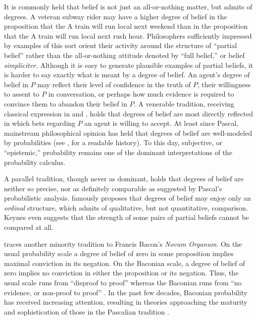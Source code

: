 It is commonly held that belief is not just an all-or-nothing matter, but admits
of degrees. A veteran subway rider may have a higher degree of belief in the
proposition that the A train will run local next weekend than in the proposition
that the A train will run local  next rush hour. Philosophers sufficiently
impressed by examples of this sort orient their activity around the structure of
``partial belief'' rather than the all-or-nothing attitude denoted by ``full
belief,'' or belief {\em simpliciter.} Although it is easy to generate plausible
examples of partial beliefs, it is harder to say exactly what is meant by a
degree of belief. An agent's degree of belief in $P$ may reflect their level of
confidence in the truth of $P$, their willingness to assent to $P$ in
conversation, or perhaps how much evidence is required to convince them to
abandon their belief in $P$. A venerable tradition, receiving classical
expression in \citet{ramseytruth} and \citet{de1937prevision}, holds that
degrees of belief are most directly reflected in which bets regarding $P$  an
agent is willing to accept. At least since Pascal, mainstream philosophical
opinion has held that degrees of belief are well-modeled by probabilities (see
\citealp{hacking1975}, for a readable history). To this day, subjective, or
``epistemic,'' probability remains one of the dominant interpretations of the
probability calculus. 

A parallel tradition, though never as dominant, holds that degrees of belief are
neither so precise, nor as definitely comparable as suggested by Pascal's
probabilistic analysis. \citet{keynes1921treatise} famously proposes that
degrees of belief may enjoy only an {\em ordinal} structure, which admits of
qualitative, but not quantitative, comparison. Keynes even suggests that the
strength of some pairs of partial beliefs cannot be compared at all.

\citet{cohen1980some} traces another minority tradition to Francis Bacon's {\em
Novum Organum}. On the usual probability scale a degree of belief of zero in
some proposition implies maximal conviction in its negation. On the Baconian
scale, a degree of belief of zero implies no conviction in either the
proposition or its negation. Thus, the usual scale runs from ``disproof to
proof'' whereas the Baconian runs from ``no evidence, or non-proof to proof''
\citep[p. 224]{cohen1980some}.  In the past few decades, Baconian probability
has received increasing attention, resulting in theories approaching the
maturity and sophistication of those in the Pascalian tradition
\citep{spohn2012laws, huber2019ranking}.

